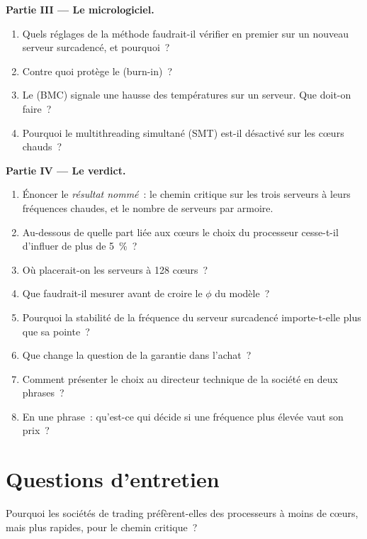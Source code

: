 \begin{problem}
\medskip\noindent\textbf{Partie III --- Le micrologiciel.}
\begin{enumerate}[resume]
\item Quels réglages de la méthode faudrait-il vérifier en premier sur un nouveau serveur surcadencé, et pourquoi~?
\item Contre quoi protège le  (burn-in)~?
\item Le  (BMC) signale une hausse des températures sur un serveur. Que doit-on faire~?
\item Pourquoi le multithreading simultané (SMT) est-il désactivé sur les cœurs chauds~?
\end{enumerate}

\medskip\noindent\textbf{Partie IV --- Le verdict.}
\begin{enumerate}[resume]
\item Énoncer le \emph{résultat nommé}~: le chemin critique sur les trois serveurs à leurs fréquences chaudes, et le nombre de serveurs par armoire.
\item Au-dessous de quelle part liée aux cœurs le choix du processeur cesse-t-il d'influer de plus de 5~\%~?
\item Où placerait-on les serveurs à 128 cœurs~?
\item Que faudrait-il mesurer avant de croire le $\phi$ du modèle~?
\item Pourquoi la stabilité de la fréquence du serveur surcadencé importe-t-elle plus que sa pointe~?
\item Que change la question de la garantie dans l'achat~?
\item Comment présenter le choix au directeur technique de la société en deux phrases~?
\item En une phrase~: qu'est-ce qui décide si une fréquence plus élevée vaut son prix~?
\end{enumerate}
\end{problem}

\section{Questions d'entretien}

\begin{interviewq}\label{iq:nw:servers:1}
Pourquoi les sociétés de trading préfèrent-elles des processeurs à moins de cœurs, mais plus rapides, pour le chemin critique~?
\end{interviewq}

